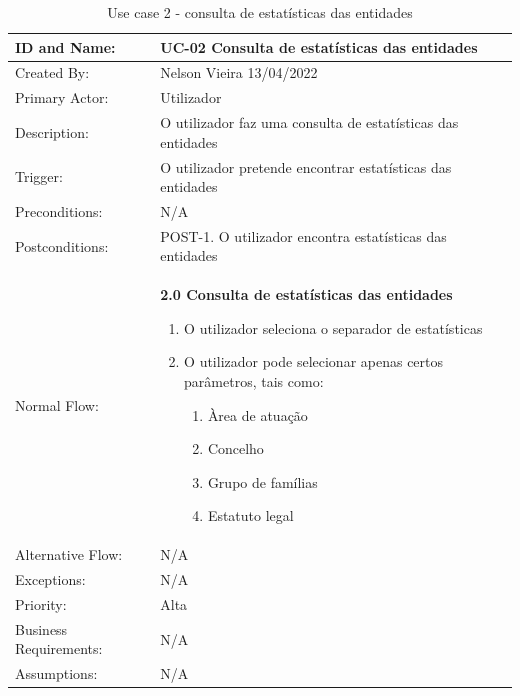 \documentclass{scrreprt}
\begin{document}
\begin{table}[H]
    \centering
    \begin{adjustbox}{width=1.2\textwidth,center=\textwidth}
        \begin{tabular}{|m{4cm}|m{12cm}|}
            \hline
            ID and Name: & UC-02 Consulta de estatísticas das entidades \\
            \hline
            Created By: & Nelson Vieira 13/04/2022 \\
            \hline
            Primary Actor: & Utilizador \\
            \hline
            Description: & O utilizador faz uma consulta de estatísticas das entidades \\
            \hline
            Trigger: & O utilizador pretende encontrar estatísticas das entidades \\
            \hline
            Preconditions: & N/A \\
            \hline
            Postconditions: & POST-1. O utilizador encontra estatísticas das entidades \\
            \hline
            Normal Flow: & \textbf{2.0 Consulta de estatísticas das entidades}
            \begin{enumerate}
                \item O utilizador seleciona o separador de estatísticas
                \item O utilizador pode selecionar apenas certos parâmetros, tais como:
                \begin{enumerate}
                    \item Àrea de atuação
                    \item Concelho
                    \item Grupo de famílias
                    \item Estatuto legal
                \end{enumerate}
            \end{enumerate} \\
            \hline
            Alternative Flow: & N/A \\
            \hline
            Exceptions: & N/A \\
            \hline
            Priority: & Alta \\
            \hline
            Business Requirements: & N/A \\
            \hline
            Assumptions: & N/A \\
            \hline
        \end{tabular}
    \end{adjustbox}
    \caption{Use case 2 - consulta de estatísticas das entidades}
    \label{use case 2}
\end{table}
\end{document}
